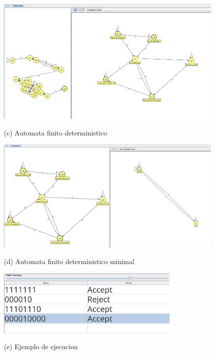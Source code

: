 \documentclass{article}
\begin{document}
        \newpage

        \begin{figure}[!h]
            \centering
            \includegraphics[width=1.2\textwidth]{./Imagenes/image15.png}
            \label{fig:label4}
            \caption*{(c) Automata finito  deterministico}
        \end{figure}

        \begin{figure}[!h]
            \centering
            \includegraphics[width=1.2\textwidth]{./Imagenes/image16.png}
            \label{fig:label4}
            \caption*{(d) Automata finito deterministico minimal}
        \end{figure}

        \newpage
        \begin{figure}[!h]
            \centering
            \includegraphics[width=0.8\textwidth]{./Imagenes/image17.png}
            \label{fig:label4}
            \caption*{(e) Ejemplo de ejecucion}
        \end{figure}
\end{document}
